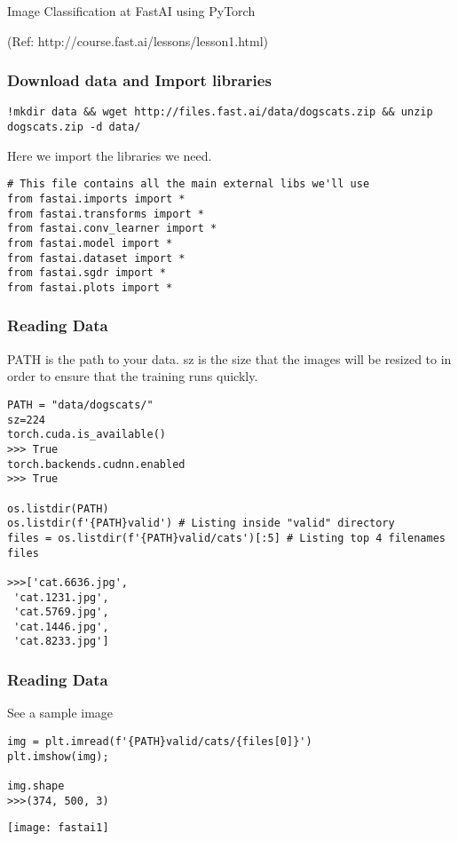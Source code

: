 \begin{frame}
  \begin{center}
    {\Large Image Classification at FastAI using PyTorch}
    
  \end{center}
  
  \tiny{(Ref: http://course.fast.ai/lessons/lesson1.html)}
\end{frame}

\begin{frame}[fragile] \frametitle{Download data and Import libraries}
\begin{lstlisting}
!mkdir data && wget http://files.fast.ai/data/dogscats.zip && unzip dogscats.zip -d data/
\end{lstlisting}
Here we import the libraries we need.
\begin{lstlisting}
# This file contains all the main external libs we'll use
from fastai.imports import *
from fastai.transforms import *
from fastai.conv_learner import *
from fastai.model import *
from fastai.dataset import *
from fastai.sgdr import *
from fastai.plots import *
\end{lstlisting}

\end{frame}

\begin{frame}[fragile] \frametitle{Reading Data}
PATH is the path to your data. sz is the size that the images will be resized to in order to ensure that the training runs quickly. 
\begin{lstlisting}
PATH = "data/dogscats/"
sz=224
torch.cuda.is_available()
>>> True
torch.backends.cudnn.enabled
>>> True

os.listdir(PATH)
os.listdir(f'{PATH}valid') # Listing inside "valid" directory
files = os.listdir(f'{PATH}valid/cats')[:5] # Listing top 4 filenames
files

>>>['cat.6636.jpg',
 'cat.1231.jpg',
 'cat.5769.jpg',
 'cat.1446.jpg',
 'cat.8233.jpg']
\end{lstlisting}

\end{frame}

\begin{frame}[fragile] \frametitle{Reading Data}
See a sample image
\begin{lstlisting}
img = plt.imread(f'{PATH}valid/cats/{files[0]}')
plt.imshow(img);

img.shape
>>>(374, 500, 3)
\end{lstlisting}
\begin{center}
\texttt{[image: fastai1]}
\end{center}
\end{frame}

